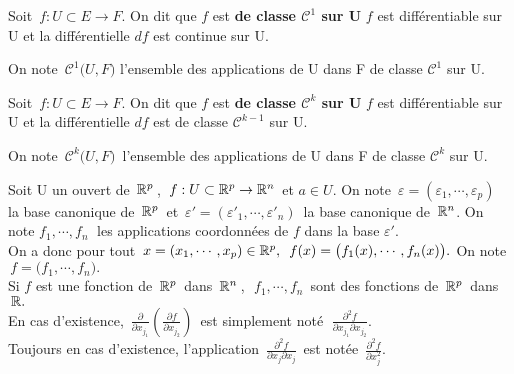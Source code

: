 \vspace{1.2cm}

Soit \(\,f:U\subset E\to F\). On dit que $f$ est \textbf{de classe $\mathscr{C}^1$ sur U} \ssi $f$ est différentiable sur U et la différentielle $df$ est continue sur U.\vspace{0.1cm}\\
\begin{small}On note $\,\mathscr{C}^1\bigl(U,F\bigr)$ l'ensemble des applications de U dans F de classe $\mathscr{C}^1$ sur U.\end{small}

\vspace{1.5cm}

Soit \(\,f:U\subset E\to F\). On dit que $f$ est \textbf{de classe $\mathscr{C}^k$ sur U} \ssi $f$ est différentiable sur U et la différentielle $df$ est de classe $\mathscr{C}^{k-1}$ sur U.\vspace{0.1cm}\\
\begin{small}On note \(\,\mathscr{C}^k\bigl(U,F\bigr)\,\) l'ensemble des applications de U dans F de classe $\mathscr{C}^k$ sur U.\end{small}

\vspace{1.7cm}

Soit U un ouvert de \(\,\mathbb{R}^p\,\), \(\,f:U\subset \mathbb{R}^p\to \mathbb{R}^n\,\) et \(a\in U\). On note \(\,\varepsilon=(\varepsilon_1,\cdots,\varepsilon_p)\,\) la base canonique de \(\,\mathbb{R}^p\,\) et \(\,\varepsilon'=(\varepsilon'_1,\cdots,\varepsilon'_n)\,\) la base canonique de \(\,\mathbb{R}^n\). On note \(f_1,\cdots,f_n\;\) les applications coordonnées de $f$ dans la base $\varepsilon'$. \\
On a donc pour tout \(\, x=(x_1,\cdots,x_p)\in \mathbb{R}^p,\ \,f(x)=\bigl(f_1(x),\cdots,f_n(x)\bigr).\) On note \(\,f=\bigl(f_1,\cdots,f_n\bigr).\)\\
Si $f$ est une fonction de \(\,\mathbb{R}^p\,\) dans \(\,\mathbb{R}^n\,\),\ \(\,f_1,\cdots,f_n\,\) sont des fonctions de \(\,\mathbb{R}^p\,\) dans \(\,\mathbb{R}.\)\vspace{0.1cm}\\
En cas d'existence, \(\,\displaystyle\frac{\partial}{\partial x_{j_1}}\!\!\left(\!\frac{\partial f}{\partial x_{j_2}}\!\right)\,\) est simplement noté \(\;\displaystyle \frac{\partial ^2\!f}{\partial x_{j_1}\partial x_{j_2}}\).\vspace{0.2cm}\\
Toujours en cas d'existence, l'application \(\,\displaystyle \frac{\partial^2\! f}{\partial x_j \partial x_j}\,\) est notée \(\,\displaystyle\frac{\partial^2\!f}{\partial x_j^2}.\)

